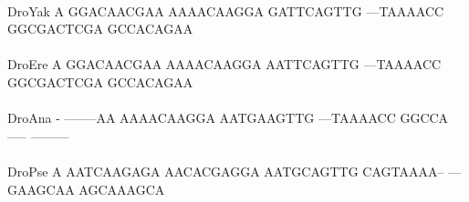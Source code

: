 \documentclass[11pt,twoside,reqno,a4paper]{article}
\begin{document}
{\hspace*{7\charwidth}\hspace*{1\charwidth}\hspace*{1\charwidth}\hspace*{1\charwidth}\hspace*{1\charwidth}\hspace*{1\charwidth}\hspace*{1\charwidth}\\
DroYak	A	GGACAACGAA	AAAACAAGGA	GATTCAGTTG	---TAAAACC	GGCGACTCGA	GCCACAGAA\\
\hspace*{7\charwidth}\hspace*{1\charwidth}\hspace*{1\charwidth}\hspace*{1\charwidth}\hspace*{1\charwidth}\hspace*{1\charwidth}\hspace*{1\charwidth}\\
DroEre	A	GGACAACGAA	AAAACAAGGA	AATTCAGTTG	---TAAAACC	GGCGACTCGA	GCCACAGAA\\
\hspace*{7\charwidth}\hspace*{1\charwidth}\hspace*{1\charwidth}\hspace*{1\charwidth}\hspace*{1\charwidth}\hspace*{1\charwidth}\hspace*{1\charwidth}\\
DroAna	-	--------AA	AAAACAAGGA	AATGAAGTTG	---TAAAACC	GGCCA-----	---------\\
\hspace*{7\charwidth}\hspace*{1\charwidth}\hspace*{1\charwidth}\hspace*{1\charwidth}\hspace*{1\charwidth}\hspace*{1\charwidth}\hspace*{1\charwidth}\\
DroPse	A	AATCAAGAGA	AACACGAGGA	AATGCAGTTG	CAGTAAAA--	---GAAGCAA	AGCAAAGCA\\
\hspace*{7\charwidth}\hspace*{1\charwidth}\hspace*{1\charwidth}\hspace*{1\charwidth}\hspace*{1\charwidth}\hspace*{1\charwidth}\hspace*{1\charwidth}\\
}
\end{document}
